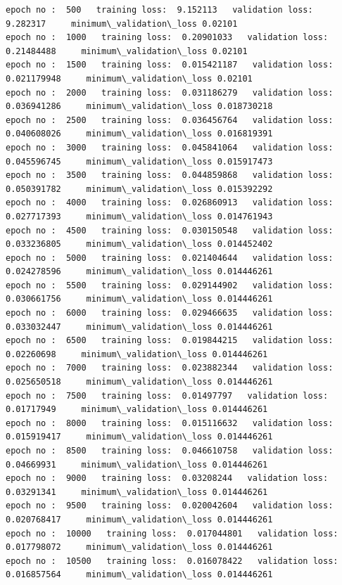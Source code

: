 \documentclass[11pt, a4paper , landscape]{article}
\begin{document}
    \begin{Verbatim}[commandchars=\\\{\}]
epoch no :  500   training loss:  9.152113   validation loss:  9.282317     minimum\_validation\_loss 0.02101
epoch no :  1000   training loss:  0.20901033   validation loss:  0.21484488     minimum\_validation\_loss 0.02101
epoch no :  1500   training loss:  0.015421187   validation loss:  0.021179948     minimum\_validation\_loss 0.02101
epoch no :  2000   training loss:  0.031186279   validation loss:  0.036941286     minimum\_validation\_loss 0.018730218
epoch no :  2500   training loss:  0.036456764   validation loss:  0.040608026     minimum\_validation\_loss 0.016819391
epoch no :  3000   training loss:  0.045841064   validation loss:  0.045596745     minimum\_validation\_loss 0.015917473
epoch no :  3500   training loss:  0.044859868   validation loss:  0.050391782     minimum\_validation\_loss 0.015392292
epoch no :  4000   training loss:  0.026860913   validation loss:  0.027717393     minimum\_validation\_loss 0.014761943
epoch no :  4500   training loss:  0.030150548   validation loss:  0.033236805     minimum\_validation\_loss 0.014452402
epoch no :  5000   training loss:  0.021404644   validation loss:  0.024278596     minimum\_validation\_loss 0.014446261
epoch no :  5500   training loss:  0.029144902   validation loss:  0.030661756     minimum\_validation\_loss 0.014446261
epoch no :  6000   training loss:  0.029466635   validation loss:  0.033032447     minimum\_validation\_loss 0.014446261
epoch no :  6500   training loss:  0.019844215   validation loss:  0.02260698     minimum\_validation\_loss 0.014446261
epoch no :  7000   training loss:  0.023882344   validation loss:  0.025650518     minimum\_validation\_loss 0.014446261
epoch no :  7500   training loss:  0.01497797   validation loss:  0.01717949     minimum\_validation\_loss 0.014446261
epoch no :  8000   training loss:  0.015116632   validation loss:  0.015919417     minimum\_validation\_loss 0.014446261
epoch no :  8500   training loss:  0.046610758   validation loss:  0.04669931     minimum\_validation\_loss 0.014446261
epoch no :  9000   training loss:  0.03208244   validation loss:  0.03291341     minimum\_validation\_loss 0.014446261
epoch no :  9500   training loss:  0.020042604   validation loss:  0.020768417     minimum\_validation\_loss 0.014446261
epoch no :  10000   training loss:  0.017044801   validation loss:  0.017798072     minimum\_validation\_loss 0.014446261
epoch no :  10500   training loss:  0.016078422   validation loss:  0.016857564     minimum\_validation\_loss 0.014446261

\end{Verbatim}
\end{document}
